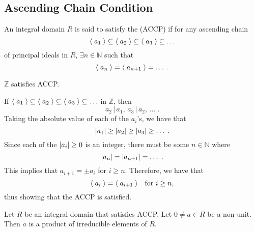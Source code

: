 \subsection{Ascending Chain Condition}%
\label{sub:ascending_chain_condition}

\begin{defn}
\label{defn:ascengding_chain_condition_on_principal_ideals}
An integral domain $R$ is said to satisfy the  (ACCP) if for any ascending chain
\begin{equation*}
  \langle \; a_1 \; \rangle \subseteq \langle \; a_2 \; \rangle \subseteq \langle \; a_3 \; \rangle \subseteq \hdots
\end{equation*}
of principal ideals in $R$, $\exists n \in \mathbb{N}$ such that
\begin{equation*}
  \langle \; a_n \; \rangle = \langle \; a_{n + 1} \; \rangle = \hdots \; .
\end{equation*}
\end{defn}

\begin{eg}
  $\mathbb{Z}$ satisfies ACCP.

  If $\langle \; a_1 \; \rangle \subseteq \langle \; a_2 \; \rangle \subseteq \langle \; a_3 \; \rangle \subseteq \hdots$ in $\mathbb{Z}$, then
  \begin{equation*}
    a_2 \, | \, a_1, \, a_3 \, | \, a_2, \, \hdots \; .
  \end{equation*}
  Taking the absolute value of each of the $a_i$'s, we have that
  \begin{equation*}
    \left|a_1\right| \geq \left|a_2\right| \geq \left|a_3\right| \geq \hdots \; .
  \end{equation*}
  Since each of the $\left|a_i\right| \geq 0$ is an integer, there must be some $n \in \mathbb{N}$ where
  \begin{equation*}
    \left|a_n\right| = \left|a_{n + 1}\right| = \hdots \; .
  \end{equation*}
  This implies that $a_{i + 1} = \pm a_i$ for $i \geq n$. Therefore, we have that 
  \begin{equation*}
    \langle \; a_i \; \rangle = \langle \; a_{i + 1} \; \rangle \quad \text{for } i \geq n,
  \end{equation*}
  thus showing that the ACCP is satisfied.
\end{eg}

\begin{thm}
\label{thm:factorization_on_an_integral_domain_satisfying_accp}
  Let $R$ be an integral domain that satisfies ACCP. Let $0 \neq a \in R$ be a non-unit. Then $a$ is a product of irreducible elements of $R$.
\end{thm}


